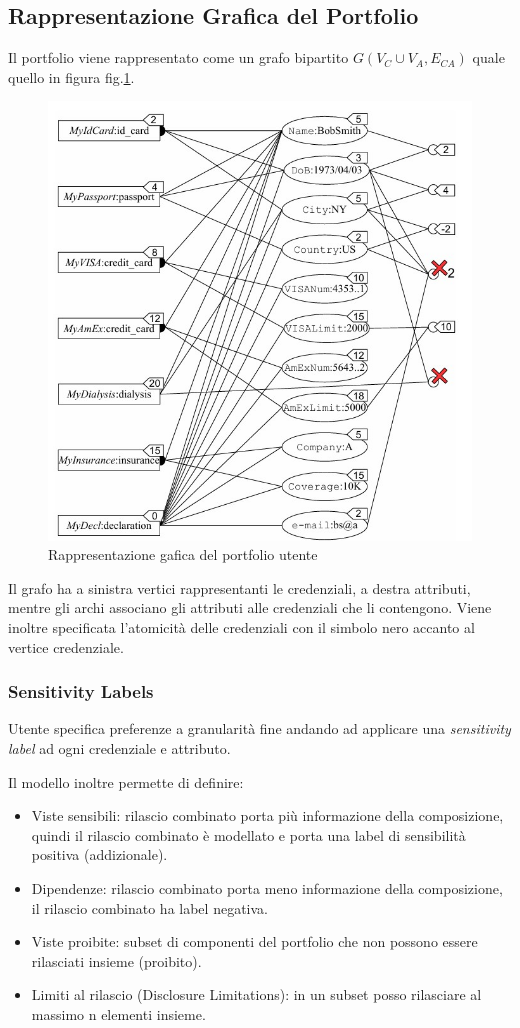 \subsection{Rappresentazione Grafica del Portfolio}
Il portfolio viene rappresentato come un grafo bipartito $G(V_C \cup V_A , E_{CA})$ quale quello in figura fig.\ref{fig:pref_graph_portfolio}.


\begin{figure}[ht]
    \centering
    \includegraphics[width=0.8\linewidth]{paper_user-privacy-preferences/00_pref_graph_portfolio.jpg}
    \caption{Rappresentazione gafica del portfolio utente}
    \label{fig:pref_graph_portfolio}
\end{figure}

Il grafo ha a sinistra vertici rappresentanti le credenziali, a destra attributi, mentre gli archi associano gli attributi alle credenziali che li contengono.
Viene inoltre specificata l'atomicità delle credenziali con il simbolo nero accanto al vertice credenziale.

\subsubsection{Sensitivity Labels}
Utente specifica preferenze a granularità fine andando ad applicare una \textit{sensitivity label} ad ogni credenziale e attributo.

Il modello inoltre permette di definire:
\begin{itemize}
    \item Viste sensibili: rilascio combinato porta più informazione della composizione, quindi il rilascio combinato è modellato e porta una label di sensibilità positiva (addizionale).
    \item Dipendenze: rilascio combinato porta meno informazione della composizione, il rilascio combinato ha label negativa.
    \item Viste proibite: subset di componenti del portfolio che non possono essere rilasciati insieme (proibito).
    \item Limiti al rilascio (Disclosure Limitations): in un subset posso rilasciare al massimo n elementi insieme. 
\end{itemize} 


